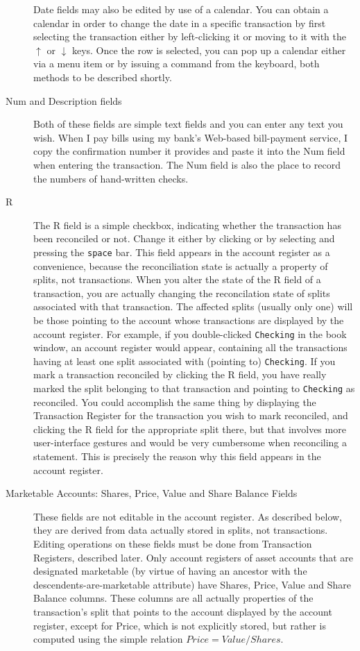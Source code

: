 \documentclass{report}
\begin{document}
\begin{description}
Date fields may also be edited by use of a calendar. You can obtain a calendar in order to change the date in a specific transaction by first selecting the transaction either by left-clicking it or moving to it with the $\uparrow$ or $\downarrow$ keys. Once the row is selected, you can pop up a calendar either via a menu item  or by issuing a command from the keyboard, both methods to be described shortly. 
\item[Num and Description fields]
Both of these fields are simple text fields and you can enter any text you wish. When I pay bills using my bank's Web-based bill-payment service, I copy the confirmation number it provides and paste it into the Num field when entering the transaction. The Num field is also the place to record the numbers of hand-written checks.
\item[R]
The R field is a simple checkbox, indicating whether the transaction has been reconciled or not. Change it either by clicking or by selecting and pressing the \verb$space$ bar. This field appears in the account register as a convenience, because the reconciliation state is actually a property of splits, not transactions. When you alter the state of the R field of a transaction, you are actually changing the reconcilation state of splits associated with that transaction. The affected splits (usually only one) will be those  pointing to the account whose transactions are displayed by the account register. For example, if you double-clicked \verb|Checking| in the book window, an account register would appear, containing all the transactions having at least one split associated with (pointing to) \verb|Checking|. If you mark a transaction reconciled by clicking the R field, you have really marked the split belonging to that transaction and pointing to \verb|Checking| as reconciled. You could accomplish the same thing by displaying the Transaction Register for the transaction you wish to mark reconciled, and clicking the R field for the appropriate split there, but that involves more user-interface gestures and would be very cumbersome when reconciling a statement. This is precisely the reason why this field appears in the account register.
\item[Marketable Accounts: Shares, Price, Value and Share Balance Fields]
These fields are not editable in the account register. As described below, they are derived from data actually stored in splits, not transactions. Editing operations on these fields must be done from Transaction Registers, described later.
Only account registers of asset accounts that are designated marketable (by virtue of having an ancestor with the descendents-are-marketable attribute) have Shares, Price, Value and Share Balance columns. These columns are all actually properties of the transaction's split that points to the account displayed by the account register, except for Price, which is not explicitly stored, but rather is computed using the simple relation $Price=Value/Shares$.


\end{description}
\end{document}
